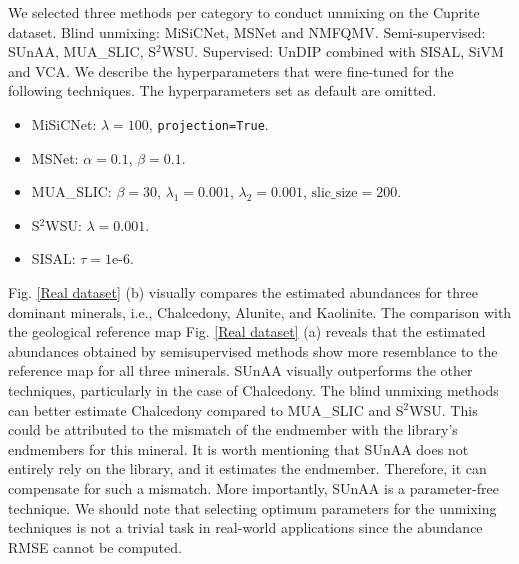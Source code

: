We selected three methods per category to conduct unmixing on the Cuprite dataset. 
Blind unmixing: MiSiCNet, MSNet and NMFQMV. 
Semi-supervised: SUnAA, MUA\_SLIC, S$^2$WSU.
Supervised: UnDIP combined with SISAL, SiVM and VCA.
We describe the hyperparameters that were fine-tuned for the following techniques.
The hyperparameters set as default are omitted.
\begin{itemize}
    \item MiSiCNet: $\lambda=100$, \texttt{projection=True}.
    \item MSNet: $\alpha=0.1$, $\beta=0.1$.
    \item MUA\_SLIC: $\beta=30$, $\lambda_1=0.001$, $\lambda_2=0.001$, $\text{slic\_size}=200$.
    \item S$^2$WSU: $\lambda=0.001$.
    \item SISAL: $\tau=1\text{e-}6$.
\end{itemize}

Fig. \ref{Real dataset} (b) visually compares the estimated abundances for three dominant minerals, i.e., Chalcedony, Alunite, and Kaolinite. The comparison with the geological reference map Fig. \ref{Real dataset} (a) reveals that the estimated abundances obtained by semisupervised methods show more resemblance to the reference map for all three minerals. SUnAA visually outperforms the other techniques, particularly in the case of Chalcedony. The blind unmixing methods can better estimate Chalcedony compared to MUA\_SLIC and S$^2$WSU. This could be attributed to the mismatch of the endmember with the library's endmembers for this mineral. It is worth mentioning that SUnAA does not entirely rely on the library, and it estimates the endmember. Therefore, it can compensate for such a mismatch. More importantly, SUnAA is a parameter-free technique. We should note that selecting optimum parameters for the unmixing techniques is not a trivial task in real-world applications since the abundance RMSE cannot be computed.   

